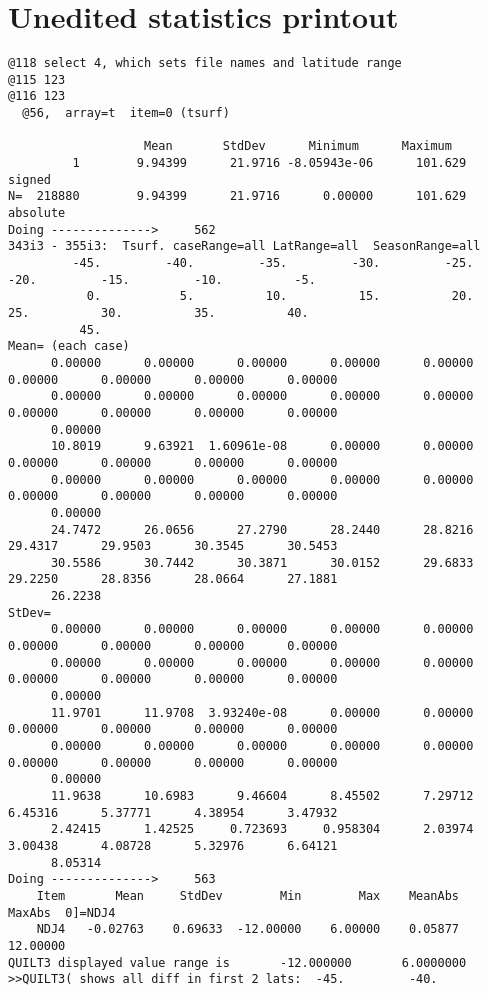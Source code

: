 \documentclass{article}
\begin{document}
\section{Unedited statistics printout} %
\vspace{-3.mm} 
\begin{verbatim}
@118 select 4, which sets file names and latitude range
@115 123 
@116 123
  @56,  array=t  item=0 (tsurf)

                   Mean       StdDev      Minimum      Maximum
         1        9.94399      21.9716 -8.05943e-06      101.629  signed
N=  218880        9.94399      21.9716      0.00000      101.629  absolute
Doing -------------->     562
343i3 - 355i3:  Tsurf. caseRange=all LatRange=all  SeasonRange=all
         -45.         -40.         -35.         -30.         -25.         -20.         -15.         -10.          -5.
           0.           5.          10.          15.          20.          25.          30.          35.          40.
          45.
Mean= (each case)
      0.00000      0.00000      0.00000      0.00000      0.00000      0.00000      0.00000      0.00000      0.00000
      0.00000      0.00000      0.00000      0.00000      0.00000      0.00000      0.00000      0.00000      0.00000
      0.00000
      10.8019      9.63921  1.60961e-08      0.00000      0.00000      0.00000      0.00000      0.00000      0.00000
      0.00000      0.00000      0.00000      0.00000      0.00000      0.00000      0.00000      0.00000      0.00000
      0.00000
      24.7472      26.0656      27.2790      28.2440      28.8216      29.4317      29.9503      30.3545      30.5453
      30.5586      30.7442      30.3871      30.0152      29.6833      29.2250      28.8356      28.0664      27.1881
      26.2238
StDev=
      0.00000      0.00000      0.00000      0.00000      0.00000      0.00000      0.00000      0.00000      0.00000
      0.00000      0.00000      0.00000      0.00000      0.00000      0.00000      0.00000      0.00000      0.00000
      0.00000
      11.9701      11.9708  3.93240e-08      0.00000      0.00000      0.00000      0.00000      0.00000      0.00000
      0.00000      0.00000      0.00000      0.00000      0.00000      0.00000      0.00000      0.00000      0.00000
      0.00000
      11.9638      10.6983      9.46604      8.45502      7.29712      6.45316      5.37771      4.38954      3.47932
      2.42415      1.42525     0.723693     0.958304      2.03974      3.00438      4.08728      5.32976      6.64121
      8.05314
Doing -------------->     563
    Item       Mean     StdDev        Min        Max    MeanAbs     MaxAbs  0]=NDJ4
    NDJ4   -0.02763    0.69633  -12.00000    6.00000    0.05877   12.00000
QUILT3 displayed value range is       -12.000000       6.0000000
>>QUILT3( shows all diff in first 2 lats:  -45.         -40.    


\end{verbatim}
\end{document}
